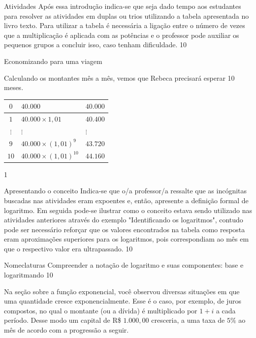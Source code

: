 \clearmargin

\begin{sugestions}{Atividades}
{
	Após essa introdução indica-se que seja dado tempo aos estudantes para resolver as atividades em duplas ou trios utilizando a tabela apresentada no livro texto. Para utilizar a tabela é necessária a ligação entre o número de vezes que a multiplicação é aplicada com as potências e o professor pode auxiliar os pequenos grupos a concluir isso, caso tenham dificuldade.
}
{1}{0}
\end{sugestions}
\begin{answer}{Economizando para uma viagem}
{
	Calculando os montantes mês a mês, vemos que Rebeca precisará esperar 10 meses.
	\begin{table}[H]
	\centering

	\begin{tabu} to \textwidth{|c|l|l|}
	\hline
	\thead
	$0$ & $40.000$ & $40.000$ \\
	\hline
	$1$ & $40.000\times1{,}01$ & $40.400$ \\
	\hline
	$\vdots$ & $\vdots$ & $\vdots$ \\
	\hline
	$9$ & $40.000\times(1{,}01)^9$ & $43.720$ \\
	\hline
	$10$ & $40.000\times(1{,}01)^{10}$ & $44.160$ \\
	\hline
	\end{tabu}
	\end{table}
	}{1}
\end{answer}
\def\currentcolor{session4}
\begin{sugestions}{Apresentando o conceito}
{
	Indica-se que o/a professor/a ressalte que as incógnitas buscadas nas atividades eram expoentes e, então, apresente a definição formal de logaritmo. Em seguida pode-se ilustrar como o conceito estava sendo utilizado nas atividades anteriores através do exemplo "Identificando os logaritmos", contudo pode ser necessário reforçar que os valores encontrados na tabela como resposta eram aproximações superiores para os logaritmos, pois correspondiam ao mês em que o respectivo valor era ultrapassado.
}{1}{0}
\end{sugestions}
\begin{objectives}{Nomeclaturas}
{
Compreender a notação de logaritmo e suas componentes: base e logaritmando}
{1}{0}
\end{objectives}

\label{expoente_incog}

Na seção sobre a função exponencial, você observou diversas situações em que uma quantidade cresce exponencialmente. Esse é o caso, por exemplo, de juros compostos, no qual o montante (ou a dívida) é multiplicado por $1+i$ a cada período. Desse modo um capital de R\$ $1.000{,}00$ cresceria, a uma taxa de $5\%$ ao mês de acordo com a progressão a seguir.

